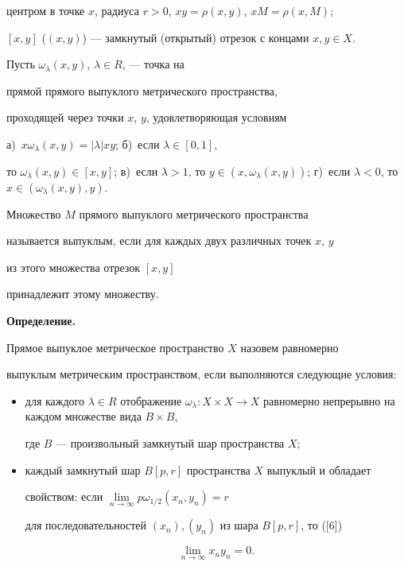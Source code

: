 центром в точке $x$, радиуса $r>0$, $xy = \rho (x,y)$, $xM = \rho (x,M)$;


$[x,y]$ ($(x,y)$) --- замкнутый (открытый) отрезок с концами $x, y \in X$.


Пусть $\omega_{\lambda}(x,y)$, $\lambda \in R$, --- точка на 


прямой прямого выпуклого метрического пространства, 


проходящей через точки $x$, $y$, удовлетворяющая условиям 


а)~$x\omega_{\lambda}(x,y) = |\lambda|xy$; б)~если $\lambda \in [0,1]$,


то $\omega_{\lambda}(x,y) \in [x,y]$; в)~если $\lambda > 1$, то $y \in


(x,\omega_{\lambda}(x,y))$; г)~если $\lambda < 0$, то $x \in


(\omega_{\lambda}(x,y),y)$.


 


Множество $M$ прямого выпуклого метрического пространства


называется выпуклым, если для каждых двух различных точек $x$, $y$


из этого множества отрезок $[x,y]$ 


принадлежит этому множеству.


\medskip





{\bf Определение.}


Прямое выпуклое метрическое пространство $X$ назовем равномерно 


выпуклым метрическим пространством, если выполняются следующие условия:


\begin{itemize} 


\item[A)] для каждого $\lambda \in R$ отображение $\omega_{\lambda}:


X\times X\to X$ равномерно непрерывно на каждом множестве вида $B\times B$,


где $B$ --- произвольный замкнутый шар пространства $X$;


\item[B)] каждый замкнутый шар $B[p,r]$ пространства $X$ выпуклый и обладает


свойством: если $\lim \limits_{n \to \infty}{p\omega_{1/2}(x_{n},y_{n})}=r$


для последовательностей $(x_{n}), (y_{n})$ из шара $B[p,r]$, то ([6])


$$


\lim \limits_{n \to \infty}{x_{n}y_{n}} = 0.


$$


\end{itemize}


